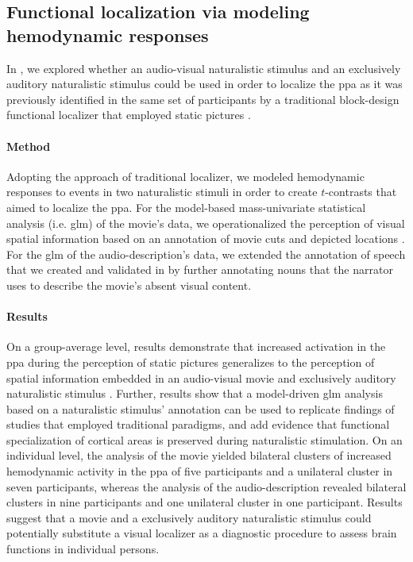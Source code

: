 \subsection{Functional localization via modeling hemodynamic responses}


In \citet{haeusler2022processing}, we explored whether an audio-visual
naturalistic stimulus and an exclusively auditory naturalistic stimulus could be
used in order to localize the \ac{ppa} as it was previously identified in the
same set of participants by a traditional block-design functional localizer that
employed static pictures \citep{sengupta2016extension}.


\paragraph{Method}
Adopting the approach of traditional localizer, we modeled hemodynamic responses
to events in two naturalistic stimuli in order to create $t$-contrasts that
aimed to localize the \ac{ppa}.
For the model-based mass-univariate statistical analysis (i.e. \ac{glm}) of the
movie's data, we operationalized the perception of visual spatial information
based on an annotation of movie cuts and depicted locations
\citep{haeusler2016cutanno}.
For the \ac{glm} of the audio-description's data, we extended the annotation of
speech that we created and validated in \citep{haeusler2021speechanno} by
further annotating nouns that the narrator uses to describe the movie's absent
visual content.


\paragraph{Results}
On a group-average level, results demonstrate that increased activation in the
\ac{ppa} during the perception of static pictures generalizes to the perception
of spatial information embedded in an audio-visual movie and exclusively
auditory naturalistic stimulus \citep{haeusler2022processing}.
Further, results show that a model-driven \ac{glm} analysis based on a
naturalistic stimulus' annotation can be used to replicate findings of studies
that employed traditional paradigms, and add evidence
\citep[cf.][]{bartels2004mapping} that functional specialization of cortical
areas is preserved during naturalistic stimulation.
On an individual level, the analysis of the movie yielded bilateral clusters of
increased hemodynamic activity in the \ac{ppa} of five participants and a
unilateral cluster in seven participants, whereas the analysis of the
audio-description revealed bilateral clusters in nine participants and one
unilateral cluster in one participant.
Results suggest that a movie and a exclusively auditory naturalistic stimulus
could potentially substitute a visual localizer as a diagnostic procedure to
assess brain functions in individual persons.


